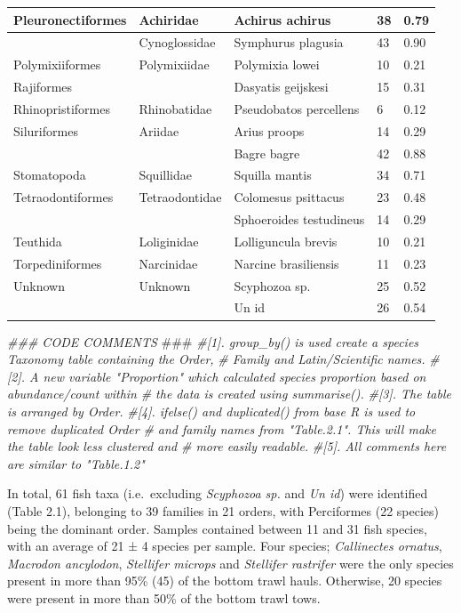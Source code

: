\documentclass[
]{book}
\newenvironment{Shaded}{\begin{snugshade}}{\end{snugshade}}
\newcommand{\AlertTok}[1]{\textcolor[rgb]{0.94,0.16,0.16}{#1}}
\newcommand{\CommentTok}[1]{\textcolor[rgb]{0.56,0.35,0.01}{\textit{#1}}}
\begin{document}
\begin{table}
\begin{tabular}[t]{l|l|l|l|l}
\hline
Pleuronectiformes & Achiridae & Achirus achirus & 38 & 0.79\\
\hline
 & Cynoglossidae & Symphurus plagusia & 43 & 0.90\\
\hline
Polymixiiformes & Polymixiidae & Polymixia lowei & 10 & 0.21\\
\hline
Rajiformes &  & Dasyatis geijskesi & 15 & 0.31\\
\hline
Rhinopristiformes & Rhinobatidae & Pseudobatos percellens & 6 & 0.12\\
\hline
Siluriformes & Ariidae & Arius proops & 14 & 0.29\\
\hline
 &  & Bagre bagre & 42 & 0.88\\
\hline
Stomatopoda & Squillidae & Squilla mantis & 34 & 0.71\\
\hline
Tetraodontiformes & Tetraodontidae & Colomesus psittacus & 23 & 0.48\\
\hline
 &  & Sphoeroides testudineus & 14 & 0.29\\
\hline
Teuthida & Loliginidae & Lolliguncula brevis & 10 & 0.21\\
\hline
Torpediniformes & Narcinidae & Narcine brasiliensis & 11 & 0.23\\
\hline
Unknown & Unknown & Scyphozoa sp. & 25 & 0.52\\
\hline
 &  & Un id & 26 & 0.54\\
\hline
\end{tabular}
\end{table}

\begin{Shaded}
\begin{Highlighting}[]
\CommentTok{### CODE COMMENTS }\AlertTok{###}
\CommentTok{#[1]. group_by() is used create a species Taxonomy table containing the Order, }
\CommentTok{#     Family and Latin/Scientific names. }
\CommentTok{#[2]. A new variable "Proportion" which calculated species proportion based on abundance/count within }
\CommentTok{#     the data is created using summarise().}
\CommentTok{#[3]. The table is arranged by Order. }
\CommentTok{#[4]. ifelse() and duplicated() from base R is used to remove duplicated Order }
\CommentTok{#     and family names from "Table.2.1". This will make the table look less clustered and}
\CommentTok{#     more easily readable. }
\CommentTok{#[5]. All comments here are similar to "Table.1.2"    }
\end{Highlighting}
\end{Shaded}

In total, 61 fish taxa (i.e.~excluding \emph{Scyphozoa sp.} and \emph{Un id}) were identified (Table 2.1), belonging to 39 families in 21 orders, with Perciformes (22 species) being the dominant order. Samples contained between 11 and 31 fish species, with an average of 21 ± 4 species per sample. Four species; \emph{Callinectes ornatus}, \emph{Macrodon ancylodon}, \emph{Stellifer microps} and \emph{Stellifer rastrifer} were the only species present in more than 95\% (45) of the bottom trawl hauls. Otherwise, 20 species were present in more than 50\% of the bottom trawl tows.
\end{document}
